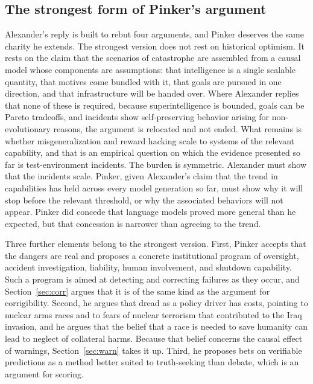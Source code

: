 \documentclass[11pt]{article}
\begin{document}
\subsection{The strongest form of Pinker's argument}

Alexander's reply is built to rebut four arguments, and Pinker deserves the same charity he extends. The strongest version does not rest on historical optimism. It rests on the claim that the scenarios of catastrophe are assembled from a causal model whose components are assumptions: that intelligence is a single scalable quantity, that motives come bundled with it, that goals are pursued in one direction, and that infrastructure will be handed over. Where Alexander replies that none of these is required, because superintelligence is bounded, goals can be Pareto tradeoffs, and incidents show self-preserving behavior arising for non-evolutionary reasons, the argument is relocated and not ended. What remains is whether misgeneralization and reward hacking scale to systems of the relevant capability, and that is an empirical question on which the evidence presented so far is test-environment incidents. The burden is symmetric. Alexander must show that the incidents scale. Pinker, given Alexander's claim that the trend in capabilities has held across every model generation so far, must show why it will stop before the relevant threshold, or why the associated behaviors will not appear. Pinker did concede that language models proved more general than he expected, but that concession is narrower than agreeing to the trend.

Three further elements belong to the strongest version. First, Pinker accepts that the dangers are real and proposes a concrete institutional program of oversight, accident investigation, liability, human involvement, and shutdown capability. Such a program is aimed at detecting and correcting failures as they occur, and Section~\ref{sec:corr} argues that it is of the same kind as the argument for corrigibility. Second, he argues that dread as a policy driver has costs, pointing to nuclear arms races and to fears of nuclear terrorism that contributed to the Iraq invasion, and he argues that the belief that a race is needed to save humanity can lead to neglect of collateral harms. Because that belief concerns the causal effect of warnings, Section~\ref{sec:warn} takes it up. Third, he proposes bets on verifiable predictions as a method better suited to truth-seeking than debate, which is an argument for scoring.
\end{document}

